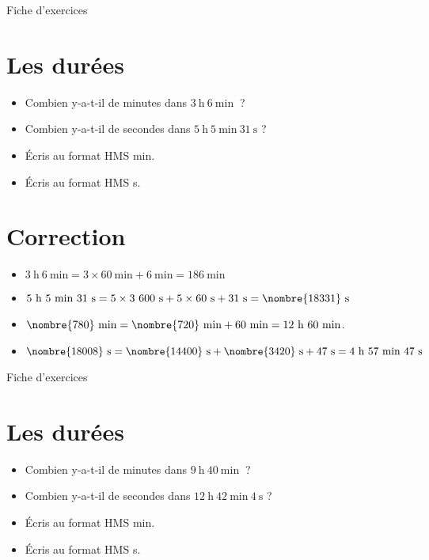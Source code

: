 \documentclass[a4paper,11pt,fleqn]{article}
\begin{document}
\newpage
\setcounter{exo}{0}
\setcounter{section}{0}
\begin{center}
	{\huge Fiche d'exercices } 	
\end{center}


\section{Les durées}
\begin{itemize}
  \item Combien y-a-t-il de minutes dans $3~\text{h}~6~\text{min}~$ ?
  \item Combien y-a-t-il de secondes dans $5~\text{h}~5~\text{min}~31~\text{s}$ ?
  \item Écris au format HMS  min.
  \item Écris au format HMS  s.
\end{itemize}

\section{Correction}
\begin{itemize}
 \item $3~\text{h}~6~\text{min}=3\times60~\text{min}+6~\text{min}=186~\text{min}$
  \item $5~\text{h}~5~\text{min}~31~\text{s}=5\times3~600~\text{s}+5\times60~\text{s}+31~\text{s}=\nombre{18331}~\text{s}$
  \item $\nombre{780}~\text{min}=\nombre{720}~\text{min}+60~\text{min}=12~\text{h}~60~\text{min}$.
  \item $\nombre{18008}~\text{s}=\nombre{14400}~\text{s}+\nombre{3420}~\text{s}+47~\text{s}=4~\text{h}~57~\text{min}~47~\text{s}$ \end{itemize}


\newpage
\setcounter{exo}{0}
\setcounter{section}{0}
\begin{center}
	{\huge Fiche d'exercices } 	
\end{center}


\section{Les durées}
\begin{itemize}
  \item Combien y-a-t-il de minutes dans $9~\text{h}~40~\text{min}~$ ?
  \item Combien y-a-t-il de secondes dans $12~\text{h}~42~\text{min}~4~\text{s}$ ?
  \item Écris au format HMS  min.
  \item Écris au format HMS  s.
\end{itemize}
\end{document}

